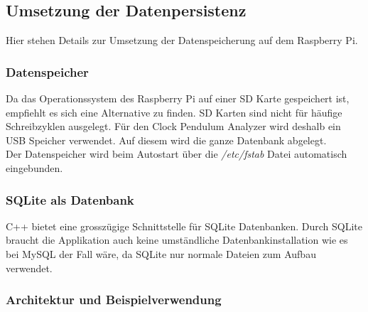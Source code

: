 \subsection{Umsetzung der Datenpersistenz}
    Hier stehen Details zur Umsetzung der Datenspeicherung auf dem Raspberry Pi.
    \subsubsection{Datenspeicher}
    Da das Operationssystem des Raspberry Pi auf einer SD Karte gespeichert ist, empfiehlt es sich eine Alternative zu finden. SD Karten sind nicht für häufige Schreibzyklen ausgelegt. Für den Clock Pendulum Analyzer wird deshalb ein USB Speicher verwendet. Auf diesem wird die ganze Datenbank abgelegt.\\
    Der Datenspeicher wird beim Autostart über die \textit{/etc/fstab} Datei automatisch eingebunden.
    
    \subsubsection{SQLite als Datenbank}
    C++ bietet eine grosszügige Schnittstelle für SQLite Datenbanken. Durch SQLite braucht die Applikation auch keine umständliche Datenbankinstallation wie es bei MySQL der Fall wäre, da SQLite nur normale Dateien zum Aufbau verwendet.
    
    \subsubsection{Architektur und Beispielverwendung}
